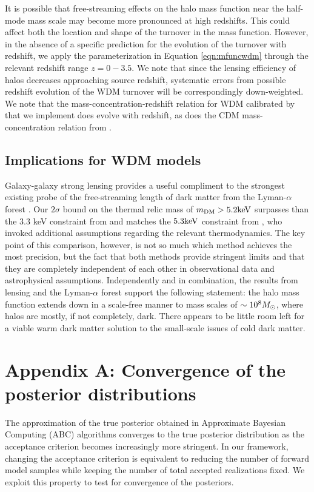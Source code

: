 It is possible that free-streaming effects on the halo mass function near the half-mode mass scale may become more pronounced at high redshifts. This could affect both the location and shape of the turnover in the mass function. However, in the absence of a specific prediction for the evolution of the turnover with redshift, we apply the parameterization in Equation \ref{eqn:mfuncwdm} through the relevant redshift range $z = 0 - 3.5$. We note that since the lensing efficiency of halos decreases approaching source redshift, systematic errors from possible redshift evolution of the WDM turnover will be correspondingly down-weighted. We note that the mass-concentration-redshift relation for WDM calibrated by \citet{Bose++16} that we implement does evolve with redshift, as does the CDM mass-concentration relation from \citet{DiemerJoyce18}. 

\subsection{Implications for WDM models}
\label{ssec:implications}

Galaxy-galaxy strong lensing provides a useful compliment to the strongest existing probe of the free-streaming length of dark matter from the Lyman-$\alpha$ forest \citep{Viel13,Irsic++17}. Our $2 \sigma$ bound on the thermal relic mass of $m_{\rm{DM}} > 5.2 \rm{keV}$ surpasses than the 3.3 keV constraint from \citet{Viel13} and matches the $5.3 \rm{keV}$ constraint from \citet{Irsic++17}, who invoked additional assumptions regarding the relevant thermodynamics. The key point of this comparison, however, is not so much which method achieves the most precision, but the fact that both methods provide stringent limits and that they are completely independent of each other in observational data and astrophysical assumptions. Independently and in combination, the results from lensing and the Lyman-$\alpha$ forest support the following statement: the halo mass function extends down in a scale-free manner to mass scales of $\sim 10^{8} {M_{\odot}}$, where halos are mostly, if not completely, dark. There appears to be little room left for a viable warm dark matter solution to the small-scale issues of cold dark matter. 

\section{Appendix A: Convergence of the posterior distributions}
\label{app:A}
The approximation of the true posterior obtained in Approximate Bayesian Computing (ABC) algorithms converges to the true posterior distribution as the acceptance criterion becomes increasingly more stringent. In our framework, changing the acceptance criterion is equivalent to reducing the number of forward model samples while keeping the number of total accepted realizations fixed. We exploit this property to test for convergence of the posteriors. 

